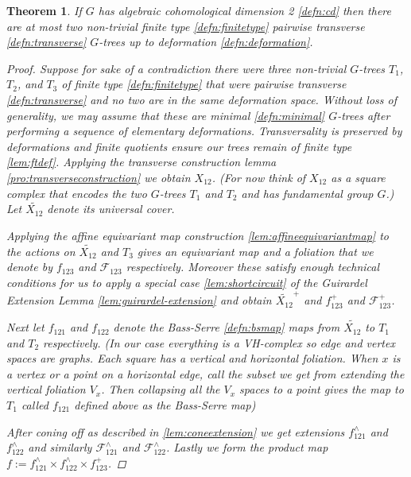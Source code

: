 \documentclass{article}
\theoremstyle{mystyle}
\newtheorem{thm}{Theorem}[section]
\theoremstyle{remark}
\begin{document}
\begin{thm}
    \label{thm:mainresult}
    If \(G\) has algebraic cohomological dimension 2 \ref{defn:cd}  then there are at most two non-trivial finite type \ref{defn:finitetype} pairwise transverse \ref{defn:transverse} \(G\)-trees up to deformation \ref{defn:deformation}.
    \begin{proof}
        Suppose for sake of a contradiction there were three non-trivial \(G\)-trees \(T_{1}\), \(T_{2}\), and \(T_{3}\) of finite type \ref{defn:finitetype} that were pairwise transverse \ref{defn:transverse} and no two are in the same deformation space. Without loss of generality, we may assume that these are minimal \ref{defn:minimal} \(G\)-trees after performing a sequence of elementary deformations. Transversality is preserved by deformations and finite quotients ensure our trees remain of finite type \ref{lem:ftdef}. Applying the transverse construction lemma \ref{pro:transverseconstruction} we obtain \(X_{12}\). (For now think of $X_{12}$ as a square complex that encodes the two $G$-trees $T_1$ and $T_2$ and has fundamental group $G$.)  Let \(\widetilde {X_{12}}\) denote its universal cover. 
        
        Applying the affine equivariant map construction \ref{lem:affineequivariantmap} to the actions on \(\widetilde {X_{12}}\) and \(T_{3}\) gives an equivariant  map and a foliation that we denote by \(f_{123}\) and \(\mathscr{F}_{123}\) respectively. Moreover these satisfy enough technical conditions for us to apply a special case \ref{lem:shortcircuit} of the Guirardel Extension Lemma \ref{lem:guirardel-extension} and obtain \(\widetilde{X_{12}}^{+}\) and \(f_{123}^{+}\) and \(\mathscr{F}_{123}^{+}\).

        Next let  \(f_{121}\) and  \(f_{122}\)  denote the Bass-Serre \ref{defn:bsmap} maps from \(\widetilde {X_{12}}\) to \(T_{1}\) and \(T_{2}\) respectively. (In our case everything is a VH-complex so edge and vertex spaces are graphs. Each square has a vertical and horizontal foliation. When $x$ is a vertex or a point on a horizontal edge, call the subset we get from extending the vertical foliation $V_x$. Then collapsing all the $V_x$ spaces to a point gives the map to $T_1$ called \(f_{121}\) defined above as the Bass-Serre map)
        
        After coning off as described in \ref{lem:coneextension} we get extensions \(f_{121}^{\wedge}\) and \(f_{122}^{\wedge}\) and similarly \(\mathscr{F}^{\wedge}_{121}\) and \(\mathscr{F}^{\wedge}_{122}\). Lastly we form the product map \(f:= f_{121}^{\wedge} \times f_{122}^{\wedge} \times f_{123}^{+}\). 


\end{proof}
\end{thm}
\end{document}
